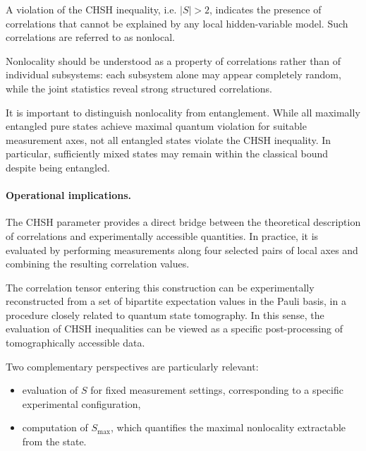A violation of the CHSH inequality, i.e. \( |S| > 2 \), indicates the presence of correlations that cannot be explained by any local hidden-variable model. Such correlations are referred to as nonlocal.

\medskip

Nonlocality should be understood as a property of correlations rather than of individual subsystems: each subsystem alone may appear completely random, while the joint statistics reveal strong structured correlations.

\medskip

It is important to distinguish nonlocality from entanglement. While all maximally entangled pure states achieve maximal quantum violation for suitable measurement axes, not all entangled states violate the CHSH inequality. In particular, sufficiently mixed states may remain within the classical bound despite being entangled.

\medskip

\paragraph{Operational implications.}

The CHSH parameter provides a direct bridge between the theoretical description of correlations and experimentally accessible quantities. In practice, it is evaluated by performing measurements along four selected pairs of local axes and combining the resulting correlation values.

\medskip

The correlation tensor entering this construction can be experimentally reconstructed from a set of bipartite expectation values in the Pauli basis, in a procedure closely related to quantum state tomography. In this sense, the evaluation of CHSH inequalities can be viewed as a specific post-processing of tomographically accessible data.

\medskip

Two complementary perspectives are particularly relevant:
\begin{itemize}
    \item evaluation of \( S \) for fixed measurement settings, corresponding to a specific experimental configuration,
    \item computation of \( S_{\max} \), which quantifies the maximal nonlocality extractable from the state.
\end{itemize}

\medskip


